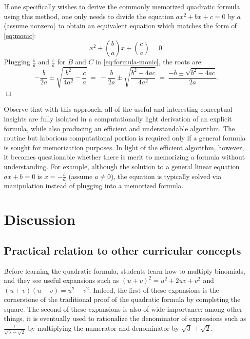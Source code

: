 \documentclass[11pt]{article}
\begin{document}
If one specifically wishes to derive the commonly memorized quadratic
formula using this method, one only needs to divide the equation $ax^2 + bx
+ c = 0$ by $a$ (assume nonzero) to obtain an equivalent equation which matches
the form of \eqref{eq:monic}:
\begin{displaymath}
  x^2 + \left( \frac{b}{a} \right) x + \left( \frac{c}{a} \right) = 0.
\end{displaymath}
Plugging $\frac{b}{a}$ and $\frac{c}{a}$ for $B$ and $C$ in
\eqref{eq:formula-monic}, the roots are:
\begin{displaymath}
  -\frac{b}{2a} \pm \sqrt{\frac{b^2}{4a^2} - \frac{c}{a}}
  \ = \ 
  -\frac{b}{2a} \pm \sqrt{\frac{b^2 - 4ac}{4a^2}}
  \ = \ 
  \frac{-b \pm \sqrt{b^2 - 4ac}}{2a}.
\end{displaymath}
\hfill $\Box$

Observe that with this approach, all of the useful and interesting conceptual
insights are fully isolated in a computationally light derivation of an explicit
formula, while also producing an efficient and understandable algorithm. The
routine but laborious computational portion is required only if a general
formula is sought for memorization purposes.  In light of the efficient
algorithm, however, it becomes questionable whether there is merit to memorizing
a formula without understanding. For example, although the solution to a general
linear equation $ax + b = 0$ is $x = -\frac{b}{a}$ (assume $a \neq 0$), the
equation is typically solved via manipulation instead of plugging into a
memorized formula.


\section{Discussion}

\subsection{Practical relation to other curricular concepts}

Before learning the quadratic formula, students learn how to multiply
binomials, and they see useful expansions such as $(u + v)^2 = u^2 + 2uv +
v^2$ and $(u+v)(u-v) = u^2 - v^2$. Indeed, the first of these expansions is
the cornerstone of the traditional proof of the quadratic formula by
completing the square. The second of these expansions is also of wide
importance: among other things, it is eventually used to rationalize the
denominator of expressions such as $\frac{1}{\sqrt{3} - \sqrt{2}}$ by
multiplying the numerator and denominator by $\sqrt{3} + \sqrt{2}$.
\end{document}

